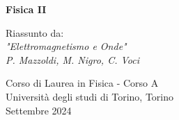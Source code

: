 \begin{titlepage}
	\begin{center}
		\vspace*{1cm}
		
		
		
		
		\textbf{\Huge Fisica II}
		
		\vspace{0.8cm}
		Riassunto da: \\
		\textit{"Elettromagnetismo e Onde" \\ P. Mazzoldi, M. Nigro, C. Voci}
		
		
		
		\vfill
		\begin{figure}[h]
			\centering
		\end{figure}
		
		
		\vfill
		\vspace{0.8cm}
		
		
		Corso di Laurea in Fisica - Corso A\\
		Università degli studi di Torino, Torino\\
		Settembre 2024\\
		
		
	\end{center}
\end{titlepage}
